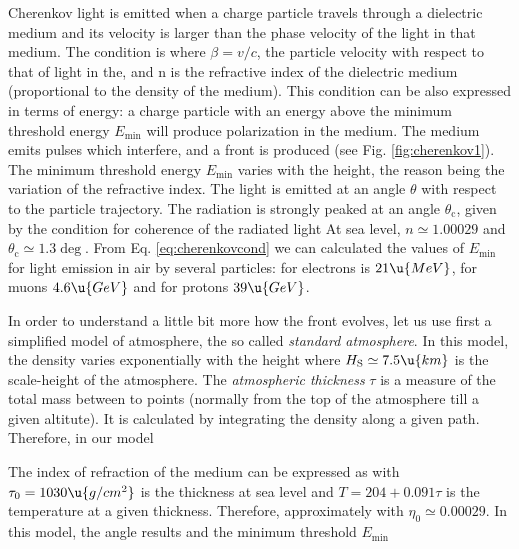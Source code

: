 Cherenkov light is emitted when a charge particle travels through a
dielectric medium and its velocity is larger than the phase velocity
of the light in that medium. The condition is
%
\Cherenkovcondeq
%
where $\beta=v/c$, the particle velocity with respect to that of light
in the, and n is the refractive index of the dielectric medium
(proportional to the density of the medium). This condition can be
also expressed in terms of energy: a charge particle with an energy
above the minimum threshold energy $E_{\mathrm{min}}$ will produce 
polarization in the medium. The medium emits pulses which interfere,
and a front is produced (see Fig. \ref{fig:cherenkov1}). The minimum
threshold energy $E_{\mathrm{min}}$ varies with the height, the reason
being the variation of the refractive index. The light is emitted at
an angle $\theta$ with respect to the particle trajectory. The
radiation is strongly peaked at an angle $\theta_{\mathrm{c}}$, given
by the condition for coherence of the radiated light
%
\lightcoherenceeq
%
At sea level, $n \simeq 1.00029$ and $\theta_{\mathrm{c}} \simeq
1.3\deg$. From Eq. \eqref{eq:cherenkovcond} we can calculated the values
of $E_{\mathrm{min}}$ for \Cherenkov light emission in air by several
particles: for electrons is $21\u{MeV}$, for muons $4.6\u{GeV}$ and
for protons $39\u{GeV}$.

In order to understand a little bit more how the \Cherenkov front
evolves, let us use first a simplified model of atmosphere, the so
called \emph{standard atmosphere}. In this model, the density varies
exponentially with the height
%
\exprhoeq
%
where $H_{\mathrm{S}} \simeq 7.5\u{km}$ is the scale-height of the
atmosphere. The \emph{atmospheric thickness} $\tau$ is a measure of
the total mass between to points (normally from the top of the
atmosphere till a given altitute). It is calculated by integrating the
density along a given path. Therefore, in our model
%
\pathinteq

\cherenkovfig
%
The index of refraction of the medium can be expressed as 
%
%
with $\tau_0=1030\u{g/cm^2}$ is the thickness at sea level and $T=204
+ 0.091\tau$ is the temperature at a given thickness. Therefore,
approximately
%
\etaeq
%
with $\eta_0 \simeq 0.00029$. In this model, the \Cherenkov angle
results 
%
\Cherenkovangleeq
%
and the minimum threshold $E_{\mathrm{min}}$
%
\Emineq

